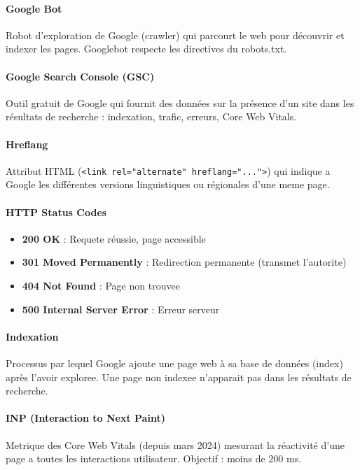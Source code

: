 \documentclass[12pt,a4paper,twoside]{report}
\begin{document}
\paragraph*{Google Bot}
Robot d'exploration de Google (crawler) qui parcourt le web pour découvrir et indexer les pages. Googlebot respecte les directives du robots.txt.

\paragraph*{Google Search Console (GSC)}
Outil gratuit de Google qui fournit des données sur la présence d'un site dans les résultats de recherche : indexation, trafic, erreurs, Core Web Vitals.

\paragraph*{Hreflang}
Attribut HTML (\texttt{<link rel="alternate" hreflang="...">}) qui indique a Google les différentes versions linguistiques ou régionales d'une meme page.

\paragraph*{HTTP Status Codes}
\begin{itemize}
    \item \textbf{200 OK} : Requete réussie, page accessible
    \item \textbf{301 Moved Permanently} : Redirection permanente (transmet l'autorite)
    \item \textbf{404 Not Found} : Page non trouvee
    \item \textbf{500 Internal Server Error} : Erreur serveur
\end{itemize}

\paragraph*{Indexation}
Processus par lequel Google ajoute une page web à sa base de données (index) après l'avoir exploree. Une page non indexee n'apparait pas dans les résultats de recherche.

\paragraph*{INP (Interaction to Next Paint)}
Metrique des Core Web Vitals (depuis mars 2024) mesurant la réactivité d'une page a toutes les interactions utilisateur. Objectif : moins de 200 ms.
\end{document}
